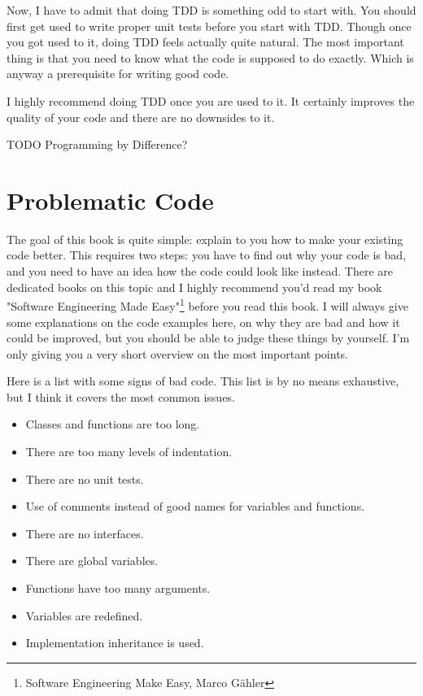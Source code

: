 Now, I have to admit that doing TDD is something odd to start with. You should first get used to write proper unit tests before you start with TDD. Though once you got used to it, doing TDD feels actually quite natural. The most important thing is that you need to know what the code is supposed to do exactly. Which is anyway a prerequisite for writing good code.

I highly recommend doing TDD once you are used to it. It certainly improves the quality of your code and there are no downsides to it.

TODO Programming by Difference?

\chapter{Problematic Code}

The goal of this book is quite simple: explain to you how to make your existing code better. This requires two steps: you have to find out why your code is bad, and you need to have an idea how the code could look like instead. There are dedicated books on this topic and I highly recommend you'd read my book "Software Engineering Made Easy"\footnote{Software Engineering Make Easy, Marco Gähler} before you read this book. I will always give some explanations on the code examples here, on why they are bad and how it could be improved, but you should be able to judge these things by yourself. I'm only giving you a very short overview on the most important points.

Here is a list with some signs of bad code. This list is by no means exhaustive, but I think it covers the most common issues.

\begin{itemize}
    \item Classes and functions are too long.
    \item There are too many levels of indentation.
    \item There are no unit tests.
    \item Use of comments instead of good names for variables and functions.
    \item There are no interfaces.
    \item There are global variables.
    \item Functions have too many arguments.
    \item Variables are redefined.
    \item Implementation inheritance is used.
\end{itemize}

